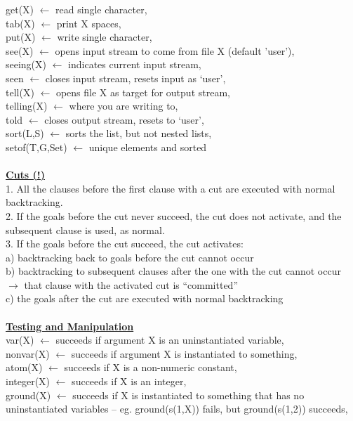 \documentclass[8pt,letterpaper,twocolumn]{article}
\begin{document}
get(X) $\leftarrow$ read single character,\\
tab(X) $\leftarrow$ print X spaces,\\
put(X) $\leftarrow$ write single character,\\
see(X) $\leftarrow$ opens input stream to come from file X (default 'user'),\\
seeing(X) $\leftarrow$ indicates current input stream,\\
seen $\leftarrow$ closes input stream, resets input as ‘user’,\\
tell(X) $\leftarrow$ opens file X as target for output stream,\\
telling(X) $\leftarrow$ where you are writing to,\\
told $\leftarrow$ closes output stream, resets to ‘user’,\\
sort(L,S) $\leftarrow$ sorts the list, but not nested lists,\\
setof(T,G,Set) $\leftarrow$ unique elements and sorted\\
\\
\underline{\textbf{Cuts (!)}}\\
1. All the clauses before the first clause with a cut are executed with normal backtracking.\\
2. If the goals before the cut never succeed, the cut does not activate, and the subsequent clause is used, as normal.\\
3. If the goals before the cut succeed, the cut activates:\\
a) backtracking back to goals before the cut cannot occur\\
b) backtracking to subsequent clauses after the one with the cut cannot occur
$\rightarrow$ that clause with the activated cut is “committed”\\
c) the goals after the cut are executed with normal backtracking\\
\\
\underline{\textbf{Testing and Manipulation}}\\
var(X) $\leftarrow$ succeeds if argument X is an uninstantiated variable,\\
nonvar(X) $\leftarrow$ succeeds if argument X is instantiated to something,\\
atom(X) $\leftarrow$ succeeds if X is a non-numeric constant,\\
integer(X) $\leftarrow$ succeeds if X is an integer,\\
ground(X) $\leftarrow$ succeeds if X is instantiated to something that has no uninstantiated variables – eg. ground(s(1,X)) fails, but ground(s(1,2)) succeeds,\\
\end{document}
